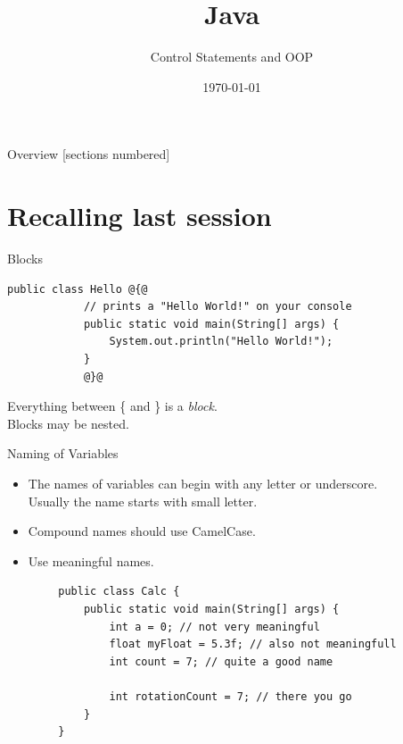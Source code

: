 


\title{Java}
\subtitle{Control Statements and OOP}
\date{\today}




\begin{frame}
	\titlepage
\end{frame}

\begin{frame}{Overview}
	[sections numbered]
	\tableofcontents
\end{frame}


\section{Recalling last session}

\begin{frame}[fragile]{Blocks}
	\begin{lstlisting}[style=base]
		public class Hello @{@
			// prints a "Hello World!" on your console
			public static void main(String[] args) {
				System.out.println("Hello World!");
			}
			@}@
	\end{lstlisting}
	Everything between \{ and \} is a \emph{block}. \\
	Blocks may be nested.
\end{frame}

\begin{frame}[fragile]{Naming of Variables}
	\begin{itemize}
		\item The names of variables can begin with any letter or underscore. \\
		Usually the name starts with small letter.
		\item Compound names should use CamelCase.
		\item Use meaningful names.
	\end{itemize}
	\begin{lstlisting}
		public class Calc {
			public static void main(String[] args) {
				int a = 0; // not very meaningful
				float myFloat = 5.3f; // also not meaningfull
				int count = 7; // quite a good name
				
				int rotationCount = 7; // there you go
			}
		}
	\end{lstlisting}
\end{frame}

